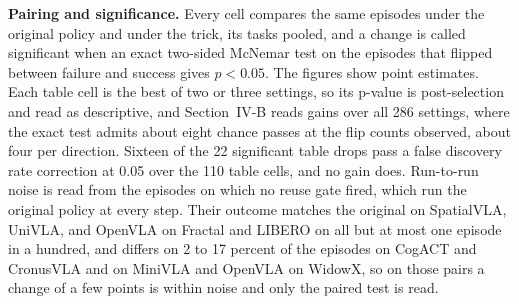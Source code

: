 \textbf{Pairing and significance.} Every cell compares the same episodes
under the original policy and under the trick, its tasks pooled, and a
change is called significant when an exact two-sided McNemar test on the
episodes that flipped between failure and success gives $p < 0.05$. The
figures show point estimates. Each table cell is the best of two or three
settings, so its p-value is post-selection and read as descriptive, and
Section~IV-B reads gains over all 286 settings, where the exact test admits about eight chance passes at the flip
counts observed, about four per direction.
Sixteen of the 22 significant table drops pass a false discovery rate
correction at 0.05 over the 110 table cells, and no gain does.
Run-to-run noise is read from the episodes on which no reuse gate fired,
which run the original policy at every step. Their outcome matches the
original on SpatialVLA, UniVLA, and OpenVLA on Fractal and LIBERO on all
but at most one episode in a hundred, and differs on 2 to 17 percent of
the episodes on CogACT and CronusVLA and on MiniVLA and OpenVLA on WidowX,
so on those pairs a change of a few points is within noise and only the
paired test is read.

